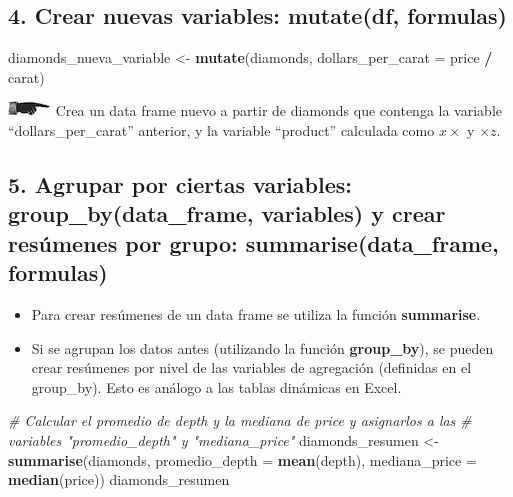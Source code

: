 \documentclass[]{book}
\newenvironment{Shaded}{\begin{snugshade}}{\end{snugshade}}
\newcommand{\KeywordTok}[1]{\textcolor[rgb]{0.13,0.29,0.53}{\textbf{#1}}}
\newcommand{\DataTypeTok}[1]{\textcolor[rgb]{0.13,0.29,0.53}{#1}}
\newcommand{\StringTok}[1]{\textcolor[rgb]{0.31,0.60,0.02}{#1}}
\newcommand{\CommentTok}[1]{\textcolor[rgb]{0.56,0.35,0.01}{\textit{#1}}}
\newcommand{\OperatorTok}[1]{\textcolor[rgb]{0.81,0.36,0.00}{\textbf{#1}}}
\newcommand{\NormalTok}[1]{#1}
\providecommand{\tightlist}{%
  \setlength{\itemsep}{0pt}\setlength{\parskip}{0pt}}
\theoremstyle{definition}
\theoremstyle{definition}
\theoremstyle{definition}
\theoremstyle{remark}
\begin{document}
\subsection{4. Crear nuevas variables: mutate(df,
formulas)}\label{crear-nuevas-variables-mutatedf-formulas}

\begin{Shaded}
\begin{Highlighting}[]
\NormalTok{diamonds_nueva_variable <-}\StringTok{ }\KeywordTok{mutate}\NormalTok{(diamonds, }\DataTypeTok{dollars_per_carat =}\NormalTok{ price }\OperatorTok{/}\StringTok{ }\NormalTok{carat)}
\end{Highlighting}
\end{Shaded}

\includegraphics{./imagenes/manicule2.jpg} Crea un data frame nuevo a
partir de diamonds que contenga la variable ``dollars\_per\_carat''
anterior, y la variable ``product'' calculada como \(x \times\) y
\(\times z\).

\subsection{5. Agrupar por ciertas variables: group\_by(data\_frame,
variables) y crear resúmenes por grupo: summarise(data\_frame,
formulas)}\label{agrupar-por-ciertas-variables-group_bydata_frame-variables-y-crear-resumenes-por-grupo-summarisedata_frame-formulas}

\begin{itemize}
\tightlist
\item
  Para crear resúmenes de un data frame se utiliza la función
  \textbf{summarise}.
\item
  Si se agrupan los datos antes (utilizando la función
  \textbf{group\_by}), se pueden crear resúmenes por nivel de las
  variables de agregación (definidas en el group\_by). Esto es análogo a
  las tablas dinámicas en Excel.
\end{itemize}

\begin{Shaded}
\begin{Highlighting}[]
\CommentTok{# Calcular el promedio de depth y la mediana de price y asignarlos a las}
\CommentTok{# variables "promedio_depth" y "mediana_price"}
\NormalTok{diamonds_resumen <-}\StringTok{ }\KeywordTok{summarise}\NormalTok{(diamonds, }\DataTypeTok{promedio_depth =} \KeywordTok{mean}\NormalTok{(depth), }\DataTypeTok{mediana_price =} \KeywordTok{median}\NormalTok{(price))}
\NormalTok{diamonds_resumen}
\end{Highlighting}
\end{Shaded}
\end{document}
